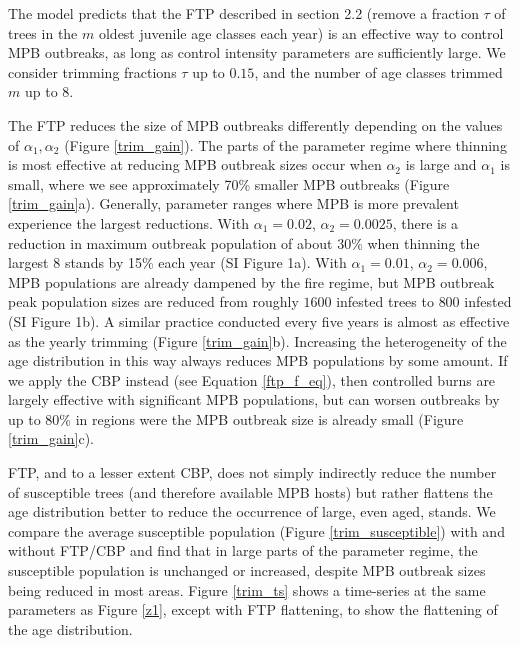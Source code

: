 The model predicts that the FTP described in section 2.2 (remove a fraction $\tau$ of trees in the $m$ oldest juvenile age classes each year) is an effective way to control MPB outbreaks, as long as control intensity parameters are sufficiently large. We consider trimming fractions $\tau$ up to $0.15$, and the number of age classes trimmed $m$ up to 8.


The FTP reduces the size of MPB outbreaks differently depending on the values of $\alpha_1,\alpha_2$ (Figure \ref{trim_gain}). The parts of the parameter regime where thinning is most effective at reducing MPB outbreak sizes occur when $\alpha_2$ is large and $\alpha_1$ is small, where we see approximately 70\% smaller MPB outbreaks (Figure \ref{trim_gain}a). Generally, parameter ranges where MPB is more prevalent experience the largest reductions. With $\alpha_1 = 0.02$, $\alpha_2 = 0.0025$, there is a reduction in maximum outbreak population of about 30\% when thinning the largest 8 stands by 15\% each year (SI Figure 1a). With $\alpha_1 = 0.01$, $\alpha_2 = 0.006$, MPB populations are already dampened by the fire regime, but MPB outbreak peak population sizes are reduced from roughly $1600$ infested trees to $800$ infested (SI Figure 1b). A similar practice conducted every five years is almost as effective as the yearly trimming (Figure \ref{trim_gain}b). Increasing the heterogeneity of the age distribution in this way always reduces MPB populations by some amount. If we apply the CBP instead (see Equation \ref{ftp_f_eq}), then controlled burns are largely effective with significant MPB populations, but can worsen outbreaks by up to 80\% in regions were the MPB outbreak size is already small (Figure \ref{trim_gain}c). 

FTP, and to a lesser extent CBP, does not simply indirectly reduce the number of susceptible trees (and therefore available MPB hosts) but rather flattens the age distribution better to reduce the occurrence of large, even aged, stands. We compare the average susceptible population (Figure \ref{trim_susceptible}) with and without FTP/CBP and find that in large parts of the parameter regime, the susceptible population is unchanged or increased, despite MPB outbreak sizes being reduced in most areas. Figure \ref{trim_ts} shows a time-series at the same parameters as Figure \ref{z1}, except with FTP flattening, to show the flattening of the age distribution.

